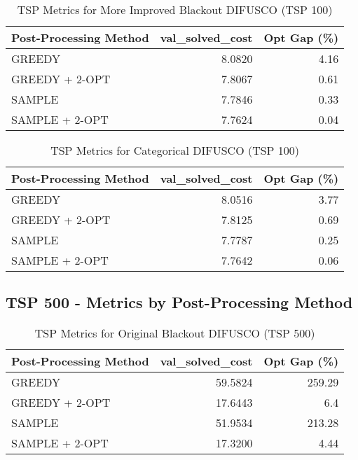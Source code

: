 \begin{table}[H]
    \centering
    \caption{TSP Metrics for More Improved Blackout DIFUSCO (TSP 100)}
    \begin{tabular}{lrr}
        \toprule
        Post-Processing Method & val\_solved\_cost & Opt Gap (\%) \\
        \midrule
        GREEDY                 & 8.0820 & 4.16 \\
        GREEDY + 2-OPT         & 7.8067 & 0.61 \\
        SAMPLE                 & 7.7846 & 0.33 \\
        SAMPLE + 2-OPT         & 7.7624 & 0.04 \\
        \bottomrule
    \end{tabular}
\end{table}

\begin{table}[H]
    \centering
    \caption{TSP Metrics for Categorical DIFUSCO (TSP 100)}
    \begin{tabular}{lrr}
        \toprule
        Post-Processing Method & val\_solved\_cost & Opt Gap (\%) \\
        \midrule
        GREEDY                 & 8.0516 & 3.77 \\
        GREEDY + 2-OPT         & 7.8125 & 0.69 \\
        SAMPLE                 & 7.7787 & 0.25 \\
        SAMPLE + 2-OPT         & 7.7642 & 0.06 \\
        \bottomrule
    \end{tabular}
\end{table}

\clearpage
\subsection*{TSP 500 - Metrics by Post-Processing Method}

\begin{table}[H]
    \centering
    \caption{TSP Metrics for Original Blackout DIFUSCO (TSP 500)}
    \begin{tabular}{lrr}
        \toprule
        Post-Processing Method & val\_solved\_cost & Opt Gap (\%) \\
        \midrule
        GREEDY                 & 59.5824 & 259.29 \\
        GREEDY + 2-OPT         & 17.6443 & 6.4 \\
        SAMPLE                 & 51.9534 & 213.28 \\
        SAMPLE + 2-OPT         & 17.3200 & 4.44 \\
        \bottomrule
    \end{tabular}
\end{table}

